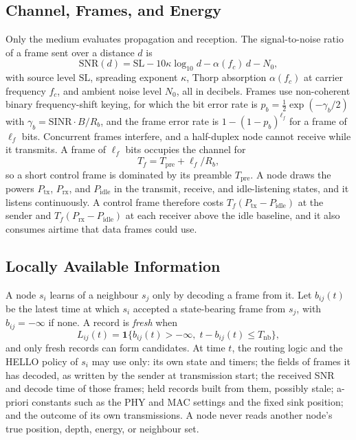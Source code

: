 \subsection{Channel, Frames, and Energy}
\label{sec:channel}
Only the medium evaluates propagation and reception. The signal-to-noise ratio of a frame sent over a distance $d$ is
\begin{equation}
\mathrm{SNR}(d)=\mathrm{SL}-10\kappa\log_{10}d-\alpha(f_c)\,d-N_0,
\label{eq:snr}
\end{equation}
with source level $\mathrm{SL}$, spreading exponent $\kappa$, Thorp absorption $\alpha(f_c)$ at carrier frequency $f_c$, and ambient noise level $N_0$, all in decibels. Frames use non-coherent binary frequency-shift keying, for which the bit error rate is $p_b=\tfrac12\exp(-\gamma_b/2)$ with $\gamma_b=\mathrm{SINR}\cdot B/R_b$, and the frame error rate is $1-(1-p_b)^{\ell_f}$ for a frame of $\ell_f$ bits. Concurrent frames interfere, and a half-duplex node cannot receive while it transmits. A frame of $\ell_f$ bits occupies the channel for
\begin{equation}
T_f=T_{\mathrm{pre}}+\ell_f/R_b,
\label{eq:duration}
\end{equation}
so a short control frame is dominated by its preamble $T_{\mathrm{pre}}$. A node draws the powers $P_{\mathrm{tx}}$, $P_{\mathrm{rx}}$, and $P_{\mathrm{idle}}$ in the transmit, receive, and idle-listening states, and it listens continuously. A control frame therefore costs $T_f(P_{\mathrm{tx}}-P_{\mathrm{idle}})$ at the sender and $T_f(P_{\mathrm{rx}}-P_{\mathrm{idle}})$ at each receiver above the idle baseline, and it also consumes airtime that data frames could use.

\subsection{Locally Available Information}
\label{sec:info}
A node $s_i$ learns of a neighbour $s_j$ only by decoding a frame from it. Let $b_{ij}(t)$ be the latest time at which $s_i$ accepted a state-bearing frame from $s_j$, with $b_{ij}=-\infty$ if none. A record is \emph{fresh} when
\begin{equation}
L_{ij}(t)=\mathbf{1}\{b_{ij}(t)>-\infty,\; t-b_{ij}(t)\le T_{\mathrm{nb}}\},
\label{eq:fresh}
\end{equation}
and only fresh records can form candidates. At time $t$, the routing logic and the HELLO policy of $s_i$ may use only: its own state and timers; the fields of frames it has decoded, as written by the sender at transmission start; the received SNR and decode time of those frames; held records built from them, possibly stale; a-priori constants such as the PHY and MAC settings and the fixed sink position; and the outcome of its own transmissions. A node never reads another node's true position, depth, energy, or neighbour set.

